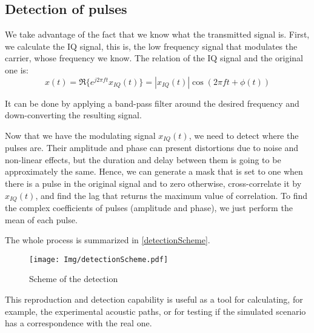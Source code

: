 \subsection{Detection of pulses}
We take advantage of the fact that we know what the transmitted signal is. First, we calculate the IQ signal, this is, the low frequency signal that modulates the carrier, whose frequency we know. The relation of the IQ signal and the original one is:
\begin{equation}
x(t) = \Re\{ e^{j 2 \pi f t} x_{IQ}(t) \} = |x_{IQ}(t)| \cos(2 \pi f t + \phi(t))
\label{IQcondition}
\end{equation}

It can be done by applying a band-pass filter around the desired frequency and down-converting the resulting signal.

Now that we have the modulating signal $x_{IQ}(t)$, we need to detect where the pulses are. Their amplitude and phase can present distortions due to noise and non-linear effects, but the duration and delay between them is going to be approximately the same. Hence, we can generate a mask that is set to one when there is a pulse in the original signal and to zero otherwise, cross-correlate it by $x_{IQ}(t)$, and find the lag that returns the maximum value of correlation. To find the complex coefficients of pulses (amplitude and phase), we just perform the mean of each pulse.

The whole process is summarized in \autoref{detectionScheme}.

\begin{figure}[h]
	\centering
	\texttt{[image: Img/detectionScheme.pdf]}
	\caption[Detection Scheme]{Scheme of the detection}
	\label{detectionScheme}
\end{figure}

This reproduction and detection capability is useful as a tool for calculating, for example, the experimental acoustic paths, or for testing if the simulated scenario has a correspondence with the real one.